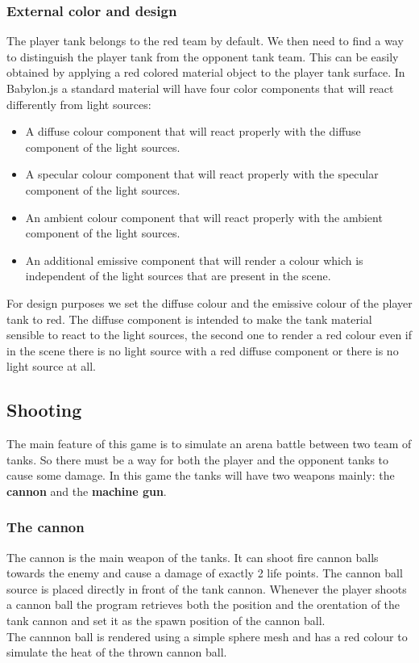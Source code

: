 \documentclass[14pt]{article}
\begin{document}
\subsubsection{External color and design}
The player tank belongs to the red team by default. We then need to find a way to distinguish the player tank from the opponent tank team. This can be easily obtained by applying a red colored material object to the player tank surface. In Babylon.js a standard material will have four color components that will react differently from light sources: 
\begin{itemize}
\item A diffuse colour component that will react properly with the diffuse component of the light sources.
\item A specular colour component that will react properly with the specular component of the light sources.
\item An ambient colour component that will react properly with the ambient component of the light sources.
\item An additional emissive component that will render a colour which is independent of the light sources that are present in the scene.
\end{itemize}
For design purposes we set the diffuse colour and the emissive colour of the player tank to red. The diffuse component is intended to make the tank material sensible to react to the light sources, the second one to render a red colour even if in the scene there is no light source with a red diffuse component or there is no light source at all.
\subsection{Shooting}
The main feature of this game is to simulate an arena battle between two team of tanks. So there must be a way for both the player and the opponent tanks to cause some damage. In this game the tanks will have two weapons mainly: the \textbf{cannon} and the \textbf{machine gun}.\\
\subsubsection{The cannon}
The cannon is the main weapon of the tanks. It can shoot fire cannon balls towards the enemy and cause a damage of exactly 2 life points. The cannon ball source is placed directly in front of the tank cannon. Whenever the player shoots a cannon ball the program retrieves both the position and the orentation of the tank cannon and set it as the spawn position of the cannon ball. \\
The cannnon ball is rendered using a simple sphere mesh and has a red colour to simulate the heat of the thrown cannon ball. \\
\end{document}
